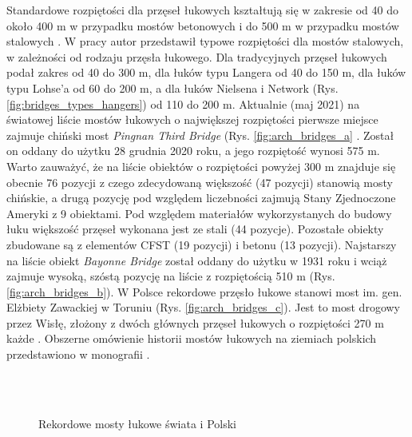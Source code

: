 Standardowe rozpiętości dla przęseł łukowych kształtują się w zakresie od 40 do około 400 m w przypadku mostów betonowych i do 500 m w przypadku mostów stalowych \parencite{Madaj2009}. W pracy \cite{Czudek1997} autor przedstawił typowe rozpiętości dla mostów stalowych, w zależności od rodzaju przęsła łukowego. Dla tradycyjnych przęseł łukowych podał zakres od 40 do 300 m, dla łuków typu Langera od 40 do 150 m, dla łuków typu Lohse'a od 60 do 200 m, a dla łuków Nielsena i Network (Rys. \ref{fig:bridges_types_hangers}) od 110 do 200 m. Aktualnie (maj 2021) na światowej liście mostów łukowych o największej rozpiętości pierwsze miejsce zajmuje chiński most \textit{Pingnan Third Bridge} (Rys. \ref{fig:arch_bridges_a} \parencite{Contributors2021,Biliszczuk2015a}. Został on oddany do użytku 28 grudnia 2020 roku, a jego rozpiętość wynosi 575 m. Warto zauważyć, że na liście obiektów o rozpiętości powyżej 300 m znajduje się obecnie 76 pozycji z czego zdecydowaną większość (47 pozycji) stanowią mosty chińskie, a drugą pozycję pod względem liczebności zajmują Stany Zjednoczone Ameryki z 9 obiektami. Pod względem materiałów wykorzystanych do budowy łuku większość przęseł wykonana  jest ze stali (44 pozycje). Pozostałe obiekty zbudowane są z elementów CFST (19 pozycji) i betonu (13 pozycji). Najstarszy na liście obiekt \textit{Bayonne Bridge} został oddany do użytku w 1931 roku i wciąż zajmuje wysoką, szóstą pozycję na liście z rozpiętością 510 m (Rys. \ref{fig:arch_bridges_b}). W Polsce rekordowe przęsło łukowe stanowi most im. gen. Elżbiety Zawackiej w Toruniu (Rys. \ref{fig:arch_bridges_c}). Jest to most drogowy przez Wisłę, złożony z dwóch głównych przęseł łukowych o rozpiętości 270 m każde \parencite{Wachalski2015}. Obszerne omówienie historii mostów łukowych na ziemiach polskich przedstawiono w monografii \cite{Biliszczuk2015}.
 
\begin{figure}[bt!]
	\centering
	\captionsetup{justification=centering}
	\;
	\\
	 \\

	
	\caption{Rekordowe mosty łukowe świata i Polski}
	\label{fig:arch_bridges}
\end{figure}


